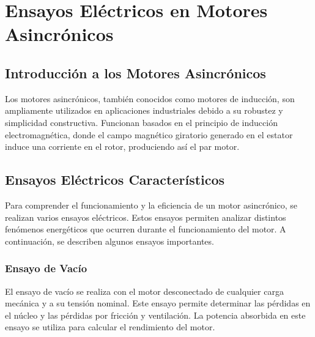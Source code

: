 \documentclass[../main]{subfiles}
\begin{document}
\chapter{Ensayos Eléctricos en Motores Asincrónicos}

\section{Introducción a los Motores Asincrónicos}

Los motores asincrónicos, también conocidos como motores de inducción, son ampliamente utilizados en aplicaciones industriales debido a su robustez y simplicidad constructiva. Funcionan basados en el principio de inducción electromagnética, donde el campo magnético giratorio generado en el estator induce una corriente en el rotor, produciendo así el par motor.

\section{Ensayos Eléctricos Característicos}

Para comprender el funcionamiento y la eficiencia de un motor asincrónico, se realizan varios ensayos eléctricos. Estos ensayos permiten analizar distintos fenómenos energéticos que ocurren durante el funcionamiento del motor. A continuación, se describen algunos ensayos importantes.

\subsection{Ensayo de Vacío}

El ensayo de vacío se realiza con el motor desconectado de cualquier carga mecánica y a su tensión nominal. Este ensayo permite determinar las pérdidas en el núcleo y las pérdidas por fricción y ventilación. La potencia absorbida en este ensayo se utiliza para calcular el rendimiento del motor.

\end{document}
